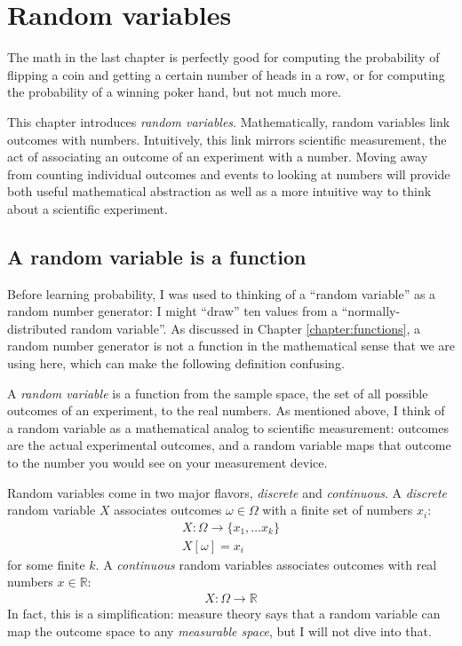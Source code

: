 
\chapter{Random variables}

The math in the last chapter is perfectly good for computing the probability
of flipping a coin and getting a certain number of heads in a row, or for
computing the probability of a winning poker hand, but not much more.

This chapter introduces \emph{random variables}. Mathematically, random
variables link outcomes with numbers. Intuitively, this link mirrors scientific
measurement, the act of associating an outcome of an experiment with a number.
Moving away from counting individual outcomes and events to looking at
numbers will provide both useful mathematical abstraction as well as a more
intuitive way to think about a scientific experiment.


\section{A random variable is a function}

Before learning probability, I was used to thinking of a ``random variable'' as
a random number generator: I might ``draw'' ten values from a
``normally-distributed random variable''. As discussed in Chapter
\ref{chapter:functions}, a random number generator is not a function in the
mathematical sense that we are using here, which can make the following
definition confusing.

A \emph{random variable} is a function from the sample space, the set of all
possible outcomes of an experiment, to the real numbers. As mentioned above, I
think of a random variable as a mathematical analog to scientific measurement:
outcomes are the actual experimental outcomes, and a random variable maps that
outcome to the number you would see on your measurement device.

Random variables come in two major flavors, \emph{discrete} and
\emph{continuous}. A \emph{discrete} random variable $X$ associates outcomes
$\omega \in \Omega$ with a finite set of numbers $x_i$:
\begin{gather*}
X : \Omega \to \{x_1, \ldots x_k\} \\
X[\omega] = x_i
\end{gather*}
for some finite $k$. A \emph{continuous} random variables associates outcomes
with real numbers $x \in \mathbb{R}$:
\begin{gather*}
X : \Omega \to \mathbb{R}
\end{gather*}
In fact, this is a simplification: measure theory says that a random variable
can map the outcome space to any \emph{measurable space}, but I will not dive
into that.

